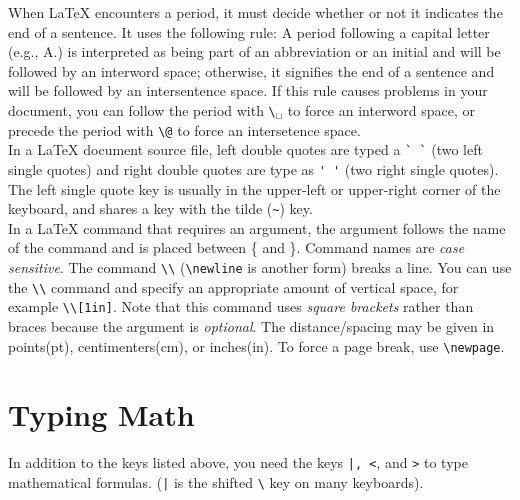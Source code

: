 \documentclass[12pt]{article}
\begin{document}
When \LaTeX \; encounters a period, it must decide whether or not it indicates the end of a sentence. It uses the following rule: A period following a capital letter (e.g., A.) is interpreted as being part of an abbreviation or an initial and will be followed by an interword space; otherwise, it signifies the end of a sentence and will be followed by an intersentence space.  If this rule causes problems in your document, you can follow the period with  \verb+\+$_{\sqcup}$ to force an interword space, or precede the period with \verb+\@+ to force an intersetence space.\\

In a \LaTeX \; document source file, left double quotes are typed a \verb+` `+ (two left single quotes) and right double quotes are type as \verb+' '+ (two right single quotes). The left single quote key is usually in the upper-left or upper-right corner of the keyboard, and shares a key with the tilde (\verb+~+) key.\\

In a \LaTeX \; command that requires an argument, the argument follows the name of the command and is placed between \{ and \}. Command names are \emph{case sensitive}. The command \verb+\\+ (\verb+\newline+ is another form) breaks a line. You can use the \verb+\\+ command and specify an appropriate amount of vertical space, for example \verb+\\[1in]+. Note that this command uses \emph{square brackets} rather than braces because the argument  is \emph{optional}. The distance/spacing may be given in points(pt), centimenters(cm), or inches(in).  To force a page break, use \verb+\newpage+.

\section{Typing Math}
In addition to the keys listed above, you need the keys \verb+|, <+, and \verb+>+ to type mathematical formulas. (\verb+|+ is the shifted \verb+\+ key on many keyboards). \\
\end{document}
